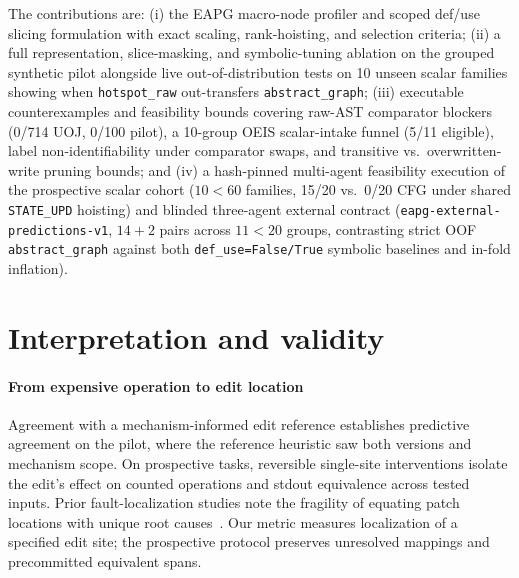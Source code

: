 \documentclass[10pt,journal]{IEEEtran}
\begin{document}
The contributions are: (i) the EAPG macro-node profiler and scoped def/use slicing formulation with exact scaling, rank-hoisting, and selection criteria; (ii) a full representation, slice-masking, and symbolic-tuning ablation on the grouped synthetic pilot alongside live out-of-distribution tests on 10 unseen scalar families showing when \nolinkurl{hotspot_raw} out-transfers \nolinkurl{abstract_graph}; (iii) executable counterexamples and feasibility bounds covering raw-AST comparator blockers (0/714 UOJ, 0/100 pilot), a 10-group OEIS scalar-intake funnel (5/11 eligible), label non-identifiability under comparator swaps, and transitive vs.\ overwritten-write pruning bounds; and (iv) a hash-pinned multi-agent feasibility execution of the prospective scalar cohort ($10 < 60$ families, 15/20 vs.\ 0/20 CFG under shared \texttt{STATE\_UPD} hoisting) and blinded three-agent external contract (\texttt{eapg-external-predictions-v1}, $14+2$ pairs across $11 < 20$ groups, contrasting strict OOF \nolinkurl{abstract_graph} against both \nolinkurl{def_use=False/True} symbolic baselines and in-fold inflation).






\section{Interpretation and validity}
\label{sec:validity}

\paragraph{From expensive operation to edit location}
Agreement with a mechanism-informed edit reference establishes predictive agreement on the pilot, where the reference heuristic saw both versions and mechanism scope. On prospective tasks, reversible single-site interventions isolate the edit's effect on counted operations and stdout equivalence across tested inputs. Prior fault-localization studies note the fragility of equating patch locations with unique root causes~\cite{soremekun2023evaluating}. Our metric measures localization of a specified edit site; the prospective protocol preserves unresolved mappings and precommitted equivalent spans.
\end{document}
